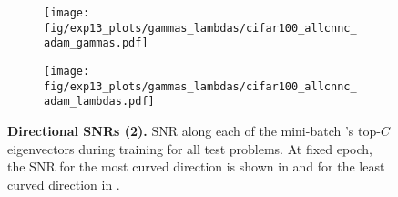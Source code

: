\begin{figure*}[p]
  \begin{subfigure}[t]{\linewidth}
    \centering
    \caption{\cifarhun \allcnnc \adam}
    \begin{minipage}{0.50\linewidth}
      \centering
      \texttt{[image: fig/exp13\_plots/gammas\_lambdas/cifar100\_allcnnc\_adam\_gammas.pdf]}
    \end{minipage}\hfill
    \begin{minipage}{0.50\linewidth}
      \centering
      \texttt{[image: fig/exp13\_plots/gammas\_lambdas/cifar100\_allcnnc\_adam\_lambdas.pdf]}
    \end{minipage}
  \end{subfigure}
  \caption{\textbf{Directional SNRs (2).} SNR along each of the mini-batch
    \ggn{}'s top-$C$ eigenvectors during training for all test problems. At fixed
    epoch, the SNR for the most curved direction is shown in
    {\protect{}} and for the least curved direction in
    {\protect{}}.
  } \label{vivit::fig:directional_derivatives_2}
\end{figure*}
